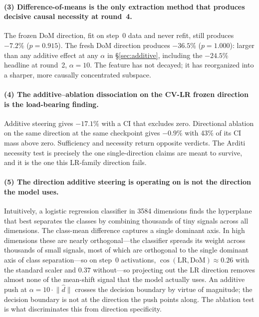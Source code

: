 \documentclass[11pt]{article}
\newcommand{\cossim}{\ensuremath{\cos}}
\begin{document}
\paragraph{(3) Difference-of-means is the only extraction method that produces decisive causal necessity at round~4.}
The frozen DoM
direction, fit on step~0 data and never refit, still produces
$-7.2\%$ ($p{=}0.915$). The fresh DoM direction produces $-36.5\%$
($p{=}1.000$): larger than any additive effect at any $\alpha$ in
\S\ref{sec:additive}, including the $-24.5\%$ headline at round~2,
$\alpha{=}10$. The feature has not decayed; it has reorganized into a
sharper, more causally concentrated subspace.

\paragraph{(4) The additive--ablation dissociation on the CV-LR frozen direction is the load-bearing finding.}
Additive steering gives
$-17.1\%$ with a CI that excludes zero. Directional ablation on the
same direction at the same checkpoint gives $-0.9\%$ with 43\% of its
CI mass above zero. Sufficiency and necessity return opposite
verdicts. The Arditi necessity test is precisely the one
single-direction claims are meant to survive, and it is the one this
LR-family direction fails.

\paragraph{(5) The direction additive steering is operating on is not the direction the model uses.}
Intuitively, a logistic regression
classifier in 3584 dimensions finds the hyperplane that best separates
the classes by combining thousands of tiny signals across all
dimensions. The class-mean difference captures a single dominant
axis. In high dimensions these are nearly orthogonal---the classifier
spreads its weight across thousands of small signals, most of which
are orthogonal to the single dominant axis of class
separation---so on step~0 activations, $\cossim(\mathrm{LR}, \mathrm{DoM}) \approx 0.26$ with
the standard scaler and $0.37$ without---so projecting out the LR
direction removes almost none of the mean-shift signal that the model
actually uses. An additive push at $\alpha{=}10 \cdot \lVert\hat
d\rVert$ crosses the decision boundary by virtue of magnitude; the
decision boundary is not at the direction the push points along. The
ablation test is what discriminates this from direction specificity.
\end{document}
